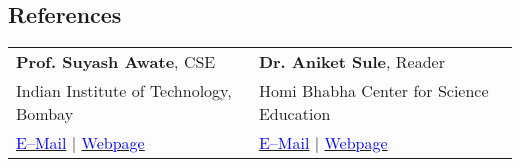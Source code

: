 \documentclass[margin,line]{res}
\begin{document}
\begin{resume}
\section{\sc References} 
\begin{tabular}{@{}p{3in}p{3in}}
\textbf{Prof. Suyash Awate}, CSE & \textbf{Dr. Aniket Sule}, Reader \\ 
Indian Institute of Technology, Bombay & Homi Bhabha Center for Science Education \\
\href{mailto:suyash@cse.iitb.ac.in}{\textcolor{blue}{E--Mail}} $|$ \href{https://www.cse.iitb.ac.in/~suyash}{\textcolor{blue}{Webpage}} & \href{mailto:anikets@hbcse.tifr.res.in}{\textcolor{blue}{E--Mail}} $|$ \href{http://www.hbcse.tifr.res.in/people/academic/aniket-sule}{\textcolor{blue}{Webpage}}\\
\end{tabular}
\end{resume}
\end{document}
